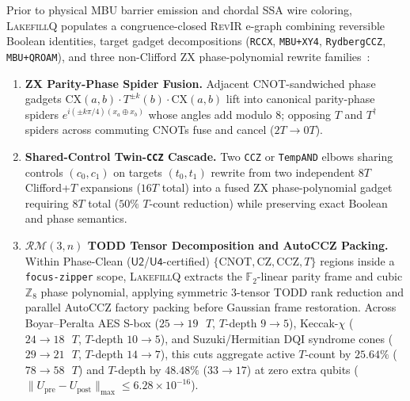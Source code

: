 \documentclass[acmsmall,screen,anonymous]{acmart}
\DeclareRobustCommand{\_}{\ifmmode\text{\char95}\else\char95\penalty0\relax\fi}
\theoremstyle{plain}
\newcommand{\LakefillQ}{\textsc{LakefillQ}}
\newcommand{\RevIR}{\textsc{RevIR}}
\begin{document}
Prior to physical MBU barrier emission and chordal SSA wire coloring, \LakefillQ{} populates a congruence-closed \RevIR{} e-graph combining reversible Boolean identities, target gadget decompositions (\texttt{RCCX}, \texttt{MBU+XY4}, \texttt{RydbergCCZ}, \texttt{MBU+QROAM}), and three non-Clifford ZX phase-polynomial rewrite families~\cite{duncan2020,kissinger2020tcount,amy2014}:
\begin{enumerate}
  \item \textbf{ZX Parity-Phase Spider Fusion.} Adjacent CNOT-sandwiched phase gadgets $\mathrm{CX}(a,b) \cdot T^{\pm k}(b) \cdot \mathrm{CX}(a,b)$ lift into canonical parity-phase spiders $e^{i (\pm k \pi / 4)(x_a \oplus x_b)}$ whose angles add modulo $8$; opposing $T$ and $T^\dagger$ spiders across commuting CNOTs fuse and cancel ($2T \to 0T$).
  \item \textbf{Shared-Control Twin-\texttt{CCZ} Cascade.} Two \texttt{CCZ} or \texttt{TempAND} elbows sharing controls $(c_0, c_1)$ on targets $(t_0, t_1)$ rewrite from two independent $8T$ Clifford+$T$ expansions ($16T$ total) into a fused ZX phase-polynomial gadget requiring $8T$ total ($50\%$ $T$-count reduction) while preserving exact Boolean and phase semantics.
  \item \textbf{$\mathcal{RM}(3,n)$ TODD Tensor Decomposition and AutoCCZ Packing.} Within Phase-Clean ($\mathsf{U2}$/$\mathsf{U4}$-certified) $\{\mathrm{CNOT}, \mathrm{CZ}, \mathrm{CCZ}, T\}$ regions inside a \texttt{focus-zipper} scope, \LakefillQ{} extracts the $\mathbb{F}_2$-linear parity frame and cubic $\mathbb{Z}_8$ phase polynomial, applying symmetric 3-tensor TODD rank reduction and parallel AutoCCZ factory packing before Gaussian frame restoration. Across Boyar--Peralta AES S-box ($25 \to 19\text{ }T$, $T$-depth $9 \to 5$), Keccak-$\chi$ ($24 \to 18\text{ }T$, $T$-depth $10 \to 5$), and Suzuki/Hermitian DQI syndrome cones ($29 \to 21\text{ }T$, $T$-depth $14 \to 7$), this cuts aggregate active $T$-count by $25.64\%$ ($78 \to 58\text{ }T$) and $T$-depth by $48.48\%$ ($33 \to 17$) at zero extra qubits ($\|U_{\mathrm{pre}} - U_{\mathrm{post}}\|_{\max} \le 6.28 \times 10^{-16}$).
\end{enumerate}
\end{document}
